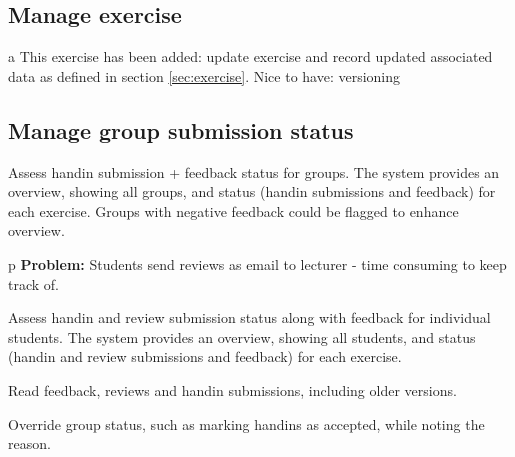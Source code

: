 \documentclass[Main]{subfiles}
\begin{document}
\subsection{Manage exercise} \label{sec:ManageExercise}

\begin{DataIntro}
 
\end{DataIntro}

\begin{TaskTable}
\RecordAddi
{a}
{This exercise has been added: update exercise and record updated associated data as defined in section \ref{sec:exercise}. }{Nice to have: versioning}{}

\end{TaskTable}





\subsection{Manage group submission status}\label{sec:ManageGroupSubmissions}

\begin{DataIntro}
\end{DataIntro}
\begin{TaskTable}
\Record
{Assess handin submission + feedback status for groups.}
{The system provides an overview, showing all groups, and status (handin submissions and feedback) for each exercise. 
Groups with negative feedback could be flagged to enhance overview.}{}

\RecordAddi
{p}
{\textbf{Problem:} Students send reviews as email to lecturer - time consuming to keep track of.}{}

\Record
{Assess handin and review submission status along with feedback for individual students.}
{The system provides an overview, showing all students, and status (handin and review submissions and feedback) for each exercise.}
{}

\Record
{Read feedback, reviews and handin submissions, including older versions.}
{}
{}

\Record
{Override group status, such as marking handins as accepted, while noting the reason.}
{}
{}
\end{TaskTable}
\end{document}
